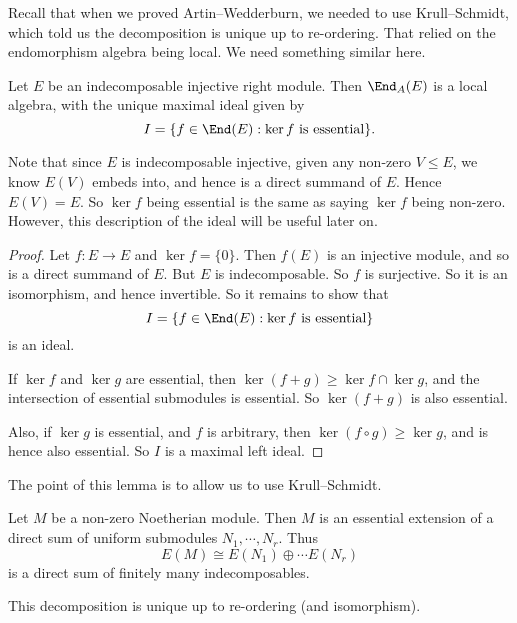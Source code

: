 \documentclass[a4paper]{article}
\begin{document}
Recall that when we proved Artin--Wedderburn, we needed to use Krull--Schmidt, which told us the decomposition is unique up to re-ordering. That relied on the endomorphism algebra being local. We need something similar here.

\begin{lemma}
  Let $E$ be an indecomposable injective right module. Then $\End_A(E)$ is a local algebra, with the unique maximal ideal given by
  \[
    I = \{f \in \End(E): \ker f\text{ is essential}\}.
  \]
\end{lemma}
Note that since $E$ is indecomposable injective, given any non-zero $V \leq E$, we know $E(V)$ embeds into, and hence is a direct summand of $E$. Hence $E(V) = E$. So $\ker f$ being essential is the same as saying $\ker f$ being non-zero. However, this description of the ideal will be useful later on.

\begin{proof}
  Let $f: E \to E$ and $\ker f = \{0\}$. Then $f(E)$ is an injective module, and so is a direct summand of $E$. But $E$ is indecomposable. So $f$ is surjective. So it is an isomorphism, and hence invertible. So it remains to show that
  \[
    I = \{f \in \End(E): \ker f\text{ is essential}\}
  \]
  is an ideal.

  If $\ker f$ and $\ker g$ are essential, then $\ker (f + g) \geq \ker f \cap \ker g$, and the intersection of essential submodules is essential. So $\ker (f + g)$ is also essential.

  Also, if $\ker g$ is essential, and $f$ is arbitrary, then $\ker (f \circ g) \geq \ker g$, and is hence also essential. So $I$ is a maximal left ideal.
\end{proof}

The point of this lemma is to allow us to use Krull--Schmidt.

\begin{lemma}
  Let $M$ be a non-zero Noetherian module. Then $M$ is an essential extension of a direct sum of uniform submodules $N_1, \cdots, N_r$. Thus
  \[
    E(M) \cong E(N_1) \oplus \cdots E(N_r)
  \]
  is a direct sum of finitely many indecomposables.

  This decomposition is unique up to re-ordering (and isomorphism).
\end{lemma}
\end{document}

